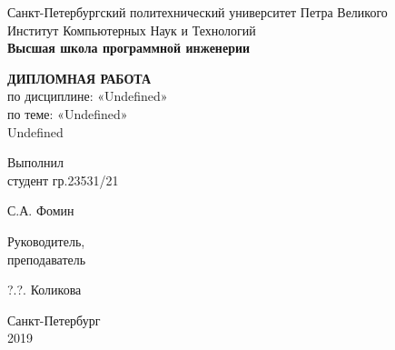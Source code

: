 \thispagestyle{empty}

\begin{center}
    Санкт-Петербургский политехнический университет Петра Великого\\
    Институт Компьютерных Наук и Технологий\\
    \bfseries{Высшая школа программной инженерии}
\end{center}

\vspace{20ex}

\begin{center}
{
\LARGE \textbf{ДИПЛОМНАЯ РАБОТА} \\[3ex]
по дисциплине: «Undefined» \\
по теме: «Undefined» \\[3ex]
Undefined
}
\end{center}

\vspace{40ex}

\noindent Выполнил\\
студент гр.23531/21\hfill
\begin{minipage}{0.7\textwidth}
    \hfill \uline{\hspace{3cm}} \hspace{1.1cm} С.А. Фомин
\end{minipage}

\vspace{3ex}

\noindent Руководитель,\\
преподаватель\hfill
\begin{minipage}{0.7\textwidth}
    \hfill \uline{\hspace{3cm}} \hspace{0.5cm} ?.?. Коликова
\end{minipage}

\vspace{3ex}

\vfill

\begin{center}
    Санкт-Петербург\\
    2019
\end{center}

